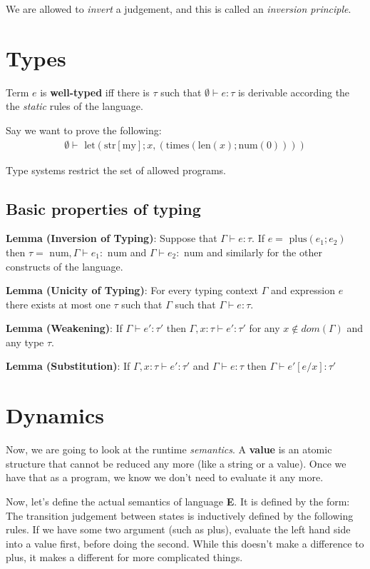 \documentclass[11pt,a4paper,titlepage,dvipsnames,cmyk]{scrartcl}
\begin{document}
We are allowed to \textit{invert} a judgement, and this is called an \textit{inversion principle}.

\section{Types}
Term $e$ is \textbf{well-typed} iff there is $\tau$ such that $\emptyset \vdash e : \tau$ is derivable according the the \textit{static} rules of the language.

Say we want to prove the following:
\begin{align*}
\emptyset \vdash \text{ let}(\text{str} [ \text{my} ]; x, (\text{times}(\text{len}(x); \text{num}(0))))
\end{align*}

Type systems restrict the set of allowed programs.

\subsection{Basic properties of typing}
\textbf{Lemma (Inversion of Typing)}: Suppose that $\Gamma \vdash e : \tau$. If $e = \text{ plus}(e_1 ;e_2)$ then $\tau = \text{ num}, \Gamma \vdash e_1 : \text{ num}$ and $\Gamma \vdash e_2 : \text{ num}$ and similarly for the other constructs of the language.

\textbf{Lemma (Unicity of Typing)}: For every typing context $\Gamma$ and expression $e$ there exists at most one $\tau$ such that $\Gamma$ such that $\Gamma \vdash e : \tau$.

\textbf{Lemma (Weakening)}: If $\Gamma \vdash e' : \tau'$ then $\Gamma, x : \tau \vdash e' : \tau'$ for any $x \not \in dom(\Gamma)$ and any type $\tau$.

\textbf{Lemma (Substitution)}: If $\Gamma, x : \tau \vdash e' : \tau'$ and $\Gamma \vdash e : \tau$ then $\Gamma \vdash e'[e/x] : \tau '$

\section{Dynamics}
Now, we are going to look at the runtime \textit{semantics}. A \textbf{value} is an atomic structure that cannot be reduced any more (like a string or a value). Once we have that as a program, we know we don't need to evaluate it any more.

Now, let's define the actual semantics of language \textbf{E}. It is defined by the form:  The transition judgement between states is inductively defined by the following rules. If we have some two argument (such as plus), evaluate the left hand side into a value first, before doing the second. While this doesn't make a difference to plus, it makes a different for more complicated things.
\end{document}
